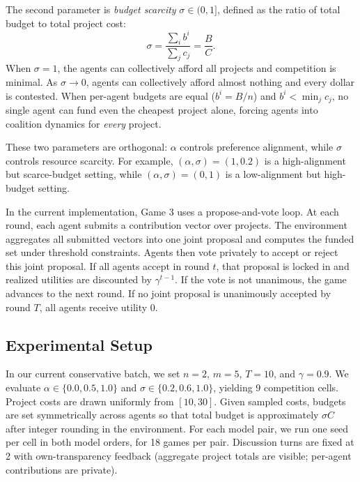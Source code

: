 The second parameter is \emph{budget scarcity} $\sigma \in (0,1]$, defined as the ratio of total budget to total project cost:
\begin{equation}
    \sigma = \frac{\sum_{i} b^i}{\sum_{j} c_j} = \frac{B}{C}.
\end{equation}
When $\sigma = 1$, the agents can collectively afford all projects and competition is minimal.
As $\sigma \to 0$, agents can collectively afford almost nothing and every dollar is contested.
When per-agent budgets are equal ($b^i = B/n$) and $b^i < \min_j c_j$, no single agent can fund even the cheapest project alone, forcing agents into coalition dynamics for \emph{every} project.

These two parameters are orthogonal: $\alpha$ controls preference alignment, while $\sigma$ controls resource scarcity.
For example, $(\alpha, \sigma) = (1, 0.2)$ is a high-alignment but scarce-budget setting, while $(\alpha, \sigma) = (0, 1)$ is a low-alignment but high-budget setting.

In the current implementation, Game 3 uses a propose-and-vote loop.
At each round, each agent submits a contribution vector over projects.
The environment aggregates all submitted vectors into one joint proposal and computes the funded set under threshold constraints.
Agents then vote privately to accept or reject this joint proposal.
If all agents accept in round $t$, that proposal is locked in and realized utilities are discounted by $\gamma^{t-1}$.
If the vote is not unanimous, the game advances to the next round.
If no joint proposal is unanimously accepted by round $T$, all agents receive utility 0.

\subsection{Experimental Setup}
\label{sec:game_3_experimental_setup}

In our current conservative batch, we set $n = 2$, $m = 5$, $T = 10$, and $\gamma = 0.9$.
We evaluate $\alpha \in \{0.0, 0.5, 1.0\}$ and $\sigma \in \{0.2, 0.6, 1.0\}$, yielding 9 competition cells.
Project costs are drawn uniformly from $[10, 30]$.
Given sampled costs, budgets are set symmetrically across agents so that total budget is approximately $\sigma C$ after integer rounding in the environment.
For each model pair, we run one seed per cell in both model orders, for 18 games per pair.
Discussion turns are fixed at 2 with own-transparency feedback (aggregate project totals are visible; per-agent contributions are private).

